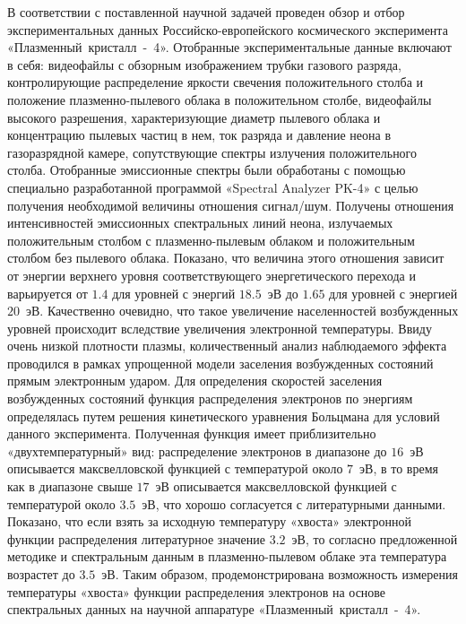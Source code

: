 \Conclusion %

В соответствии с поставленной научной задачей проведен обзор и отбор
экспериментальных данных Российско-европейского космического эксперимента
«Плазменный~кристалл~-~4». Отобранные экспериментальные данные включают в
себя: видеофайлы с обзорным изображением трубки газового разряда,
контролирующие распределение яркости свечения положительного столба и
положение плазменно-пылевого облака в положительном столбе, видеофайлы
высокого разрешения, характеризующие диаметр пылевого облака и концентрацию
пылевых частиц в нем, ток разряда и давление неона в газоразрядной камере,
сопутствующие спектры излучения положительного столба. Отобранные
эмиссионные спектры были обработаны с помощью специально разработанной
программой «Spectral Analyzer PK-4» с целью получения необходимой величины
отношения сигнал/шум. Получены отношения интенсивностей эмиссионных
спектральных линий неона, излучаемых положительным столбом с плазменно-пылевым
облаком и положительным столбом без пылевого облака. Показано, что
величина этого отношения зависит от энергии верхнего уровня соответствующего
энергетического перехода и варьируется от $1.4$ для уровней с энергий $18.5$~эВ до
$1.65$ для уровней с энергией $20$~эВ. Качественно очевидно, что такое увеличение
населенностей возбужденных уровней происходит вследствие увеличения
электронной температуры. Ввиду очень низкой плотности плазмы, количественный
анализ наблюдаемого эффекта проводился в рамках упрощенной модели заселения
возбужденных состояний прямым электронным ударом. Для определения
скоростей заселения возбужденных состояний функция распределения электронов
по энергиям определялась путем решения кинетического уравнения Больцмана для условий
данного эксперимента. Полученная функция имеет приблизительно «двухтемпературный» вид:
распределение электронов в диапазоне до $16$~эВ описывается
максвелловской функцией с температурой около $7$~эВ, в то время как в диапазоне
свыше $17$~эВ описывается максвелловской функцией с температурой около $3.5$~эВ,
что хорошо согласуется с литературными данными. Показано, что если взять за
исходную температуру «хвоста» электронной функции распределения
литературное значение $3.2$~эВ, то согласно предложенной методике и
спектральным данным в плазменно-пылевом облаке эта температура возрастет до
$3.5$~эВ. Таким образом, продемонстрирована возможность измерения температуры
«хвоста» функции распределения электронов на основе спектральных данных на
научной аппаратуре «Плазменный~кристалл~-~4».